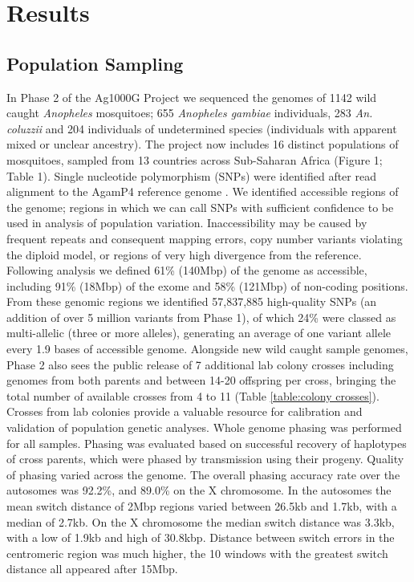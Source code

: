 \documentclass[a4paper,11pt,abstracton,hidelinks]{scrartcl}
\begin{document}
\section*{Results}

\subsection*{Population Sampling}
%
In Phase 2 of the Ag1000G Project we sequenced the genomes of 1142 wild caught \emph{Anopheles} mosquitoes; 655 \textit{Anopheles gambiae} individuals, 283 \textit{An. coluzzii} and 204 individuals of undetermined species (individuals with apparent mixed or unclear ancestry).
%
The project now includes 16 distinct populations of mosquitoes, sampled from 13 countries across Sub-Saharan Africa (Figure 1; Table 1). 
%
Single nucleotide polymorphism (SNPs) were identified after read alignment to the AgamP4 reference genome \cite{Holt2002}.
%
We identified accessible regions of the genome; regions in which we can call SNPs with sufficient confidence to be used in analysis of population variation.
%
Inaccessibility may be caused by frequent repeats and consequent mapping errors, copy number variants violating the diploid model, or regions of very high divergence from the reference.
%
Following analysis we defined 61\% (140Mbp) of the genome as accessible, including 91\% (18Mbp) of the exome and 58\% (121Mbp) of non-coding positions.
%
From these genomic regions we identified 57,837,885 high-quality SNPs (an addition of over 5 million variants from Phase 1\cite{Ag1000gConsortium2017}), of which 24\% were classed as multi-allelic (three or more alleles), generating an average of one variant allele every 1.9 bases of accessible genome.
%
Alongside new wild caught sample genomes, Phase 2 also sees the public release of 7 additional lab colony crosses including genomes from both parents and between 14-20 offspring per cross, bringing the total number of available crosses from 4 to 11 (Table \ref{table:colony crosses}).
%
Crosses from lab colonies provide a valuable resource for calibration and validation of population genetic analyses.
%
Whole genome phasing was performed for all samples. 
%
Phasing was evaluated based on successful recovery of haplotypes of cross parents, which were phased by transmission using their progeny.
Quality of phasing varied across the genome. 
%
The overall phasing accuracy rate over the autosomes was 92.2\%, and 89.0\% on the X chromosome.
%
In the autosomes the mean switch distance of 2Mbp regions varied between 26.5kb and 1.7kb, with a median of 2.7kb.
%
On the X chromosome the median switch distance was 3.3kb, with a low of 1.9kb and high of 30.8kbp.
%
Distance between switch errors in the centromeric region was much higher, the 10 windows with the greatest switch distance all appeared after 15Mbp.
\end{document}

